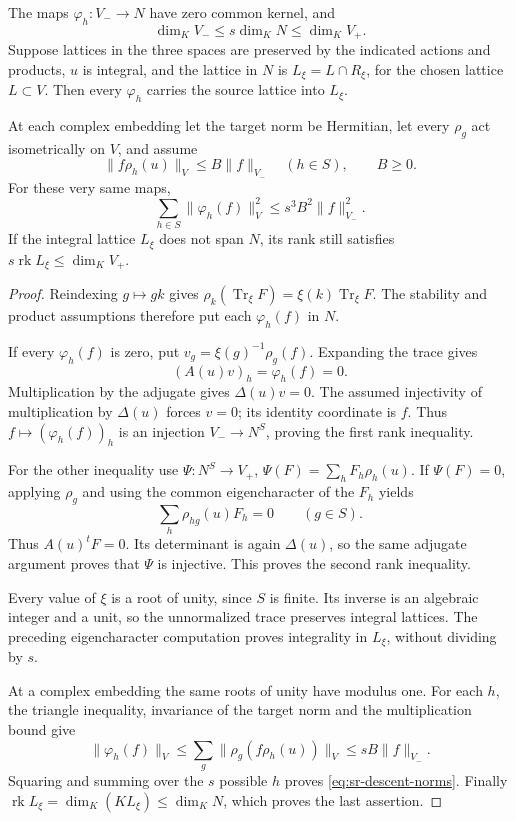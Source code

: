 \begin{srproposition}\label{prop:sr-twisted-trace-descent}
The maps \(\varphi_h:V_-\to N\) have zero common kernel, and
\begin{equation}\label{eq:sr-descent-ranks}
           \dim_K V_-\leq s\dim_K N\leq\dim_K V_+ .
\end{equation}
Suppose lattices in the three spaces are preserved by the indicated
actions and products, \(u\) is integral, and the lattice in \(N\)
is \(L_\xi=L\cap R_\xi\), for the chosen lattice \(L\subset V\).
Then every \(\varphi_h\) carries the source lattice into \(L_\xi\).

At each complex embedding let the target norm be Hermitian,
let every \(\rho_g\) act isometrically on \(V\), and assume
\[
                  \|f\rho_h(u)\|_V\leq B\|f\|_{V_-}
                  \quad(h\in S),\qquad B\geq0 .
\]
For these very same maps,
\begin{equation}\label{eq:sr-descent-norms}
                \sum_{h\in S}\|\varphi_h(f)\|_V^2
                              \leq s^3 B^2\|f\|_{V_-}^2 .
\end{equation}
If the integral lattice \(L_\xi\) does not span \(N\), its rank
still satisfies \(s\operatorname{rk}L_\xi\leq\dim_K V_+\).
\end{srproposition}
\begin{proof}
Reindexing \(g\mapsto gk\) gives
\(\rho_k(\operatorname{Tr}_\xi F)=\xi(k)\operatorname{Tr}_\xi F\).
The stability and product assumptions therefore put each
\(\varphi_h(f)\) in \(N\).

If every \(\varphi_h(f)\) is zero, put
\(v_g=\xi(g)^{-1}\rho_g(f)\).  Expanding the trace gives
\[
                    (A(u)v)_h=\varphi_h(f)=0 .
\]
Multiplication by the adjugate gives \(\Delta(u)v=0\).
The assumed injectivity of multiplication by \(\Delta(u)\)
forces \(v=0\); its identity coordinate is \(f\).  Thus
\(f\mapsto(\varphi_h(f))_h\) is an injection \(V_-\to N^S\),
proving the first rank inequality.

For the other inequality use
\(\Psi:N^S\to V_+\), \(\Psi(F)=\sum_h F_h\rho_h(u)\).
If \(\Psi(F)=0\), applying \(\rho_g\) and using the common
eigencharacter of the \(F_h\) yields
\[
                  \sum_h \rho_{hg}(u)F_h=0\qquad(g\in S).
\]
Thus \(A(u)^t F=0\).  Its determinant is again \(\Delta(u)\),
so the same adjugate argument proves that \(\Psi\) is injective.
This proves the second rank inequality.

Every value of \(\xi\) is a root of unity, since \(S\) is finite.
Its inverse is an algebraic integer and a unit, so the
unnormalized trace preserves integral lattices.  The preceding
eigencharacter computation proves integrality in \(L_\xi\),
without dividing by \(s\).

At a complex embedding the same roots of unity have modulus one.
For each \(h\), the triangle inequality, invariance of the target
norm and the multiplication bound give
\[
 \|\varphi_h(f)\|_V
 \leq\sum_g\|\rho_g(f\rho_h(u))\|_V
 \leq sB\|f\|_{V_-}.
\]
Squaring and summing over the \(s\) possible \(h\) proves
\eqref{eq:sr-descent-norms}.  Finally
\(\operatorname{rk}L_\xi=\dim_K(KL_\xi)\leq\dim_K N\),
which proves the last assertion.
\end{proof}

